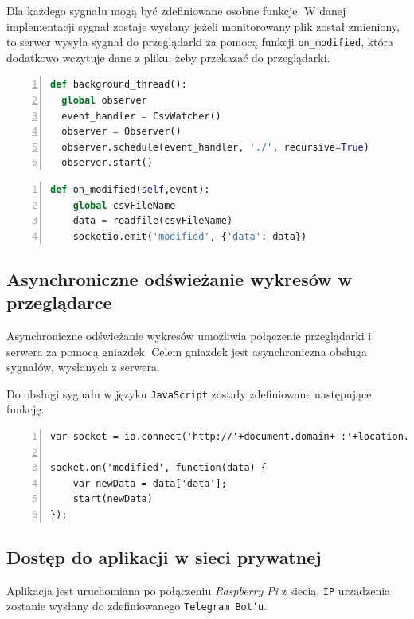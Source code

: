 \documentclass[a4paper]{article}
\begin{document}
    Dla każdego sygnału mogą być zdefiniowane osobne funkcje. 
    W danej implementacji sygnał zostaje wysłany 
    jeżeli monitorowany plik został zmieniony, to serwer wysyła sygnał
    do przeglądarki za pomocą funkcji \texttt{on\_modified}, która dodatkowo
    wczytuje dane z pliku, żeby przekazać do przeglądarki.
   \begin{lstlisting}[frame=single, numbers=left, basicstyle=\ttfamily\small, language=python,
    caption={Definicja wątku, monitorującego zmiany w plikach o zadanych rozszerzeniu}]
def background_thread():
  global observer
  event_handler = CsvWatcher()
  observer = Observer()
  observer.schedule(event_handler, './', recursive=True)
  observer.start()
   \end{lstlisting}

\begin{lstlisting}[frame=single, numbers=left, basicstyle=\ttfamily\small, language=python,
    caption={Definicja funkcji wysyłającej sygnał i dane}]
def on_modified(self,event):
    global csvFileName
    data = readfile(csvFileName)
    socketio.emit('modified', {'data': data})
   \end{lstlisting}

    \subsection{Asynchroniczne odświeżanie wykresów w przeglądarce}
    Asynchroniczne odświeżanie wykresów umożliwia połączenie przeglądarki i serwera za pomocą gniazdek.
    Celem gniazdek jest asynchroniczna obsługa sygnałów, wysłanych z serwera.
    
    Do obsługi sygnału w języku \texttt{JavaScript} zostały zdefiniowane następujące funkcję:
\begin{lstlisting}[frame=single, numbers=left, basicstyle=\ttfamily\small,
    caption={Połączenie gniazdek w przeglądrce z serwerem i odebranie danych}]
var socket = io.connect('http://'+document.domain+':'+location.port);

socket.on('modified', function(data) {
    var newData = data['data'];
    start(newData)
});
\end{lstlisting}
    \subsection{Dostęp do aplikacji w sieci prywatnej}
    Aplikacja jest uruchomiana po połączeniu \textit{Raspberry Pi} z siecią.
    \texttt{IP} urządzenia zostanie wysłany do zdefiniowanego \texttt{Telegram Bot'u}.
\end{document}
